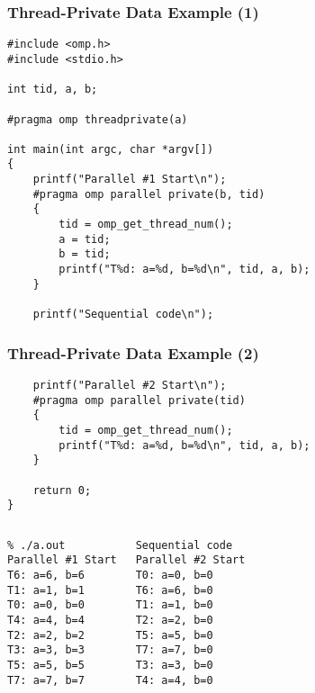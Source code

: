 \begin{frame}[fragile]
  \frametitle{Thread-Private Data Example (1)}

  
  \begin{lstlisting}
#include <omp.h>
#include <stdio.h>

int tid, a, b;

#pragma omp threadprivate(a)

int main(int argc, char *argv[])
{
    printf("Parallel #1 Start\n");
    #pragma omp parallel private(b, tid)
    {
        tid = omp_get_thread_num();
        a = tid;
        b = tid;
        printf("T%d: a=%d, b=%d\n", tid, a, b);
    }

    printf("Sequential code\n");
  \end{lstlisting}
  


\end{frame}

\begin{frame}[fragile]
  \frametitle{Thread-Private Data Example (2)}

  
  \begin{lstlisting}
    printf("Parallel #2 Start\n");
    #pragma omp parallel private(tid)
    {
        tid = omp_get_thread_num();
        printf("T%d: a=%d, b=%d\n", tid, a, b);
    }

    return 0;
}    
  \end{lstlisting}
  
  
  \begin{center}
    \begin{columns}[c]
      \column{1.5in}
        \begin{lstlisting}
% ./a.out
Parallel #1 Start
T6: a=6, b=6
T1: a=1, b=1
T0: a=0, b=0
T4: a=4, b=4
T2: a=2, b=2
T3: a=3, b=3
T5: a=5, b=5
T7: a=7, b=7
        \end{lstlisting}
      \column{1.5in}
        \begin{lstlisting}
Sequential code
Parallel #2 Start
T0: a=0, b=0
T6: a=6, b=0
T1: a=1, b=0
T2: a=2, b=0
T5: a=5, b=0
T7: a=7, b=0
T3: a=3, b=0
T4: a=4, b=0
        \end{lstlisting}
    \end{columns}
  \end{center}
\end{frame}


